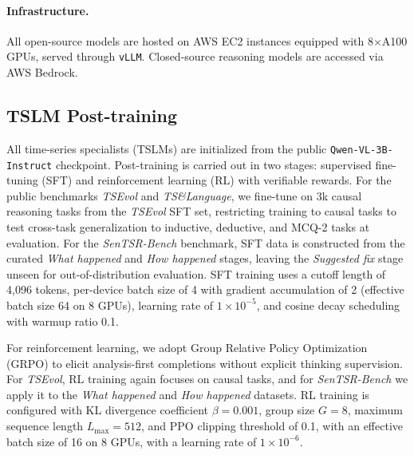 \documentclass[twoside]{article}
\begin{document}
\paragraph{Infrastructure.}  
All open-source models are hosted on AWS EC2 instances equipped with 8$\times$A100 GPUs, served through \texttt{vLLM}. Closed-source reasoning models are accessed via AWS Bedrock.

\subsection{TSLM Post-training}
\label{app:tslm-training}

All time-series specialists (TSLMs) are initialized from the public \texttt{Qwen-VL-3B-Instruct} checkpoint. Post-training is carried out in two stages: supervised fine-tuning (SFT) and reinforcement learning (RL) with verifiable rewards. For the public benchmarks \emph{TSEvol} and \emph{TS\&Language}, we fine-tune on 3k causal reasoning tasks from the \emph{TSEvol} SFT set, restricting training to causal tasks to test cross-task generalization to inductive, deductive, and MCQ-2 tasks at evaluation. For the \emph{SenTSR-Bench} benchmark, SFT data is constructed from the curated \emph{What happened} and \emph{How happened} stages, leaving the \emph{Suggested fix} stage unseen for out-of-distribution evaluation. SFT training uses a cutoff length of 4{,}096 tokens, per-device batch size of 4 with gradient accumulation of 2 (effective batch size 64 on 8 GPUs), learning rate of \(1\times 10^{-5}\), and cosine decay scheduling with warmup ratio 0.1.

For reinforcement learning, we adopt Group Relative Policy Optimization (GRPO) to elicit analysis-first completions without explicit thinking supervision. For \emph{TSEvol}, RL training again focuses on causal tasks, and for \emph{SenTSR-Bench} we apply it to the \emph{What happened} and \emph{How happened} datasets. RL training is configured with KL divergence coefficient \(\beta=0.001\), group size \(G=8\), maximum sequence length \(L_{\max}=512\), and PPO clipping threshold of 0.1, with an effective batch size of 16 on 8 GPUs, with a learning rate of \(1\times 10^{-6}\). 
\end{document}

